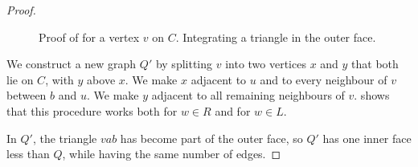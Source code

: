 \documentclass{patmorin}
\begin{document}
\begin{proof}
  \begin{figure}
     \caption{Proof of  for a vertex
       $v$ on $C$. Integrating a triangle in the outer face.}
   \end{figure}


 We construct a new graph $Q'$ by splitting $v$ into two vertices $x$
 and $y$ that both lie on $C$, with $y$ above $x$.
 We make $x$ adjacent to $u$ and to every neighbour of
 $v$ between $b$ and $u$.
 We make
 $y$ adjacent to all remaining neighbours of $v$.
 shows that this procedure works both for $w\in R$
and for $w\in L$.
 
   In $Q'$, the triangle $vab$ has become part of the outer face, so $Q'$ has one inner
   face less than $Q$, while having the same number of edges.
   

\end{proof}
\end{document}
